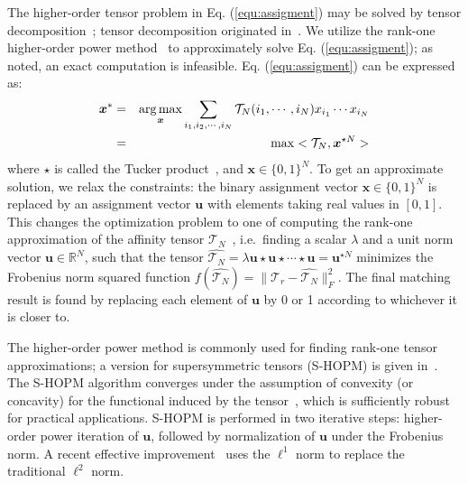 The higher-order tensor problem in Eq. (\ref{equ:assigment}) may be solved by tensor decomposition~\cite{Kolda08};
tensor decomposition originated in~\cite{Hitchcock27}.
We utilize the rank-one higher-order power method~\cite{Lathauwer95} to approximately solve Eq. (\ref{equ:assigment}); as noted, an exact computation is infeasible.
Eq. (\ref{equ:assigment}) can be expressed as:
\begin{eqnarray}
\label{equ:assigment2}
{\boldsymbol{x}}^* &=& \operatorname*{arg\,max}_{\boldsymbol{x}} \sum_{i_1,i_2,\cdots,i_N} \mathcal{T}_N(i_1,\cdots,i_N) x_{i_1} \cdots x_{i_N} \nonumber\\
&=& \max <\mathcal{T}_N, \boldsymbol{x}^{\star N}>
\end{eqnarray}
where $\star$ is called the Tucker product~\cite{Kofidis02}, and $\boldsymbol{x} \in \{0,1\}^{N}$.
To get an approximate solution, we relax the constraints:
the binary assignment vector $\boldsymbol{x}\in \{0,1\}^{N}$ is replaced by an assignment vector $\boldsymbol{u}$ with elements taking real values in $[0,1]$.
This changes the optimization problem to one of computing the rank-one approximation of the affinity tensor $\mathcal{T}_N$~\cite{Kofidis02},
i.e.\ finding a scalar $\lambda$ and a unit norm vector $\boldsymbol{u}\in \mathbb{R}^{N}$,
such that the tensor $\hat{\mathcal{T}_N} = \lambda \boldsymbol{u}\star \boldsymbol{u} \star\cdots \star \boldsymbol{u}=\boldsymbol{u}^{\star N}$ minimizes the Frobenius norm squared function $f(\hat{\mathcal{T}_N})=\lVert \mathcal{T}_r-\hat{\mathcal{T}_N} \lVert^2_F$.
The final matching result is found by replacing each element of $\boldsymbol{u}$ by 0 or 1 according to whichever it is closer to.

The higher-order power method is commonly used for finding rank-one tensor approximations; a version for supersymmetric tensors (S-HOPM) is given in~\cite{Kofidis02}.
The S-HOPM algorithm converges under the assumption of convexity (or concavity) for the functional induced by the tensor~\cite{Kofidis02},
which is sufficiently robust for practical applications.
S-HOPM is performed in two iterative steps: higher-order power iteration of $\boldsymbol{u}$, followed by normalization of $\boldsymbol{u}$ under the Frobenius norm.
A recent effective improvement~\cite{Duchenne09} uses the $\mathcal{\ell}^1$ norm to replace the traditional $\mathcal{\ell}^2$ norm.


